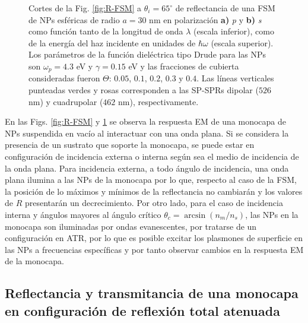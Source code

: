 \begin{figure}[h!]
	\caption{Cortes de la Fig. \ref{fig:R-FSM} a $\theta_i = 65^\circ$ de reflectancia de una FSM de NPs esféricas de radio $a=30$ nm en polarización \textbf{a)} \emph{p} y \textbf{b)} \emph{s} como función tanto de la longitud de onda $\lambda$ (escala inferior), como de la energía del haz incidente en unidades de $\hbar\omega$ (escala superior). Los parámetros de la función dieléctrica tipo Drude para las NPs son $\omega_p = 4.3$ eV y $\gamma = 0.15$ eV y las fracciones de cubierta consideradas fueron $\Theta$: $0. 05$, $0. 1$, $0. 2$, $0. 3$ y $0. 4$. Las líneas verticales punteadas verdes y rosas corresponden a las SP-SPRs dipolar ($526$ nm) y cuadrupolar ($462$ nm), respectivamente.}\label{fig:FSM-Cuts}
	\end{figure}	

%	
En las Figs. \ref{fig:R-FSM} y \ref{fig:FSM-Cuts} se observa la respuesta EM de una monocapa de NPs suspendida en vacío al interactuar con una onda plana. Si se considera la presencia de un sustrato que soporte la monocapa, se puede estar en configuraci\'on de incidencia externa o interna seg\'un sea el medio de incidencia de la onda plana. Para incidencia externa, a todo ángulo de incidencia,  una onda plana ilumina a las NPs de la monocapa por lo que, respecto al caso de la FSM, la posición de lo máximos y mínimos de la reflectancia no cambiarán y los valores de $R$ presentarán un decrecimiento. Por otro lado, para el caso de incidencia interna y ángulos mayores al ángulo crítico $\theta_c = \arcsin(n_m/n_s)$, las NPs en la monocapa son iluminadas por ondas evanescentes, por tratarse de un configuración en ATR, por lo que es posible excitar los plasmones de superficie en las NPs a frecuencias específicas y por tanto observar cambios en la respuesta EM de la monocapa.

	\subsection{Reflectancia y transmitancia de una monocapa en configuración de reflexión total atenuada}

